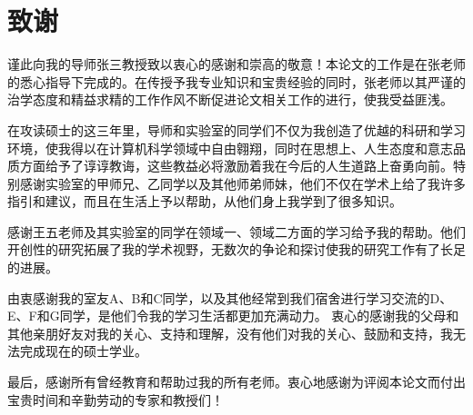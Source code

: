 
\chapter*{致\quad 谢}

谨此向我的导师张三教授致以衷心的感谢和崇高的敬意！本论文的工作是在张老师的悉心指导下完成的。在传授予我专业知识和宝贵经验的同时，张老师以其严谨的治学态度和精益求精的工作作风不断促进论文相关工作的进行，使我受益匪浅。
 
在攻读硕士的这三年里，导师和实验室的同学们不仅为我创造了优越的科研和学习环境，使我得以在计算机科学领域中自由翱翔，同时在思想上、人生态度和意志品质方面给予了谆谆教诲，这些教益必将激励着我在今后的人生道路上奋勇向前。特别感谢实验室的甲师兄、乙同学以及其他师弟师妹，他们不仅在学术上给了我许多指引和建议，而且在生活上予以帮助，从他们身上我学到了很多知识。

感谢王五老师及其实验室的同学在领域一、领域二方面的学习给予我的帮助。他们开创性的研究拓展了我的学术视野，无数次的争论和探讨使我的研究工作有了长足的进展。

由衷感谢我的室友A、B和C同学，以及其他经常到我们宿舍进行学习交流的D、E、F和G同学，是他们令我的学习生活都更加充满动力。
衷心的感谢我的父母和其他亲朋好友对我的关心、支持和理解，没有他们对我的关心、鼓励和支持，我无法完成现在的硕士学业。 

最后，感谢所有曾经教育和帮助过我的所有老师。衷心地感谢为评阅本论文而付出宝贵时间和辛勤劳动的专家和教授们！

\maketime

